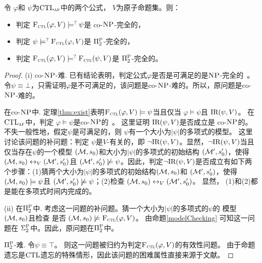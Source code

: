 \begin{theorem}[Entailment]
	\label{thm:comF}
	令 $\varphi$和 $\psi$为$\textrm{CTL}_{\textsc{a} \textsc{f}}$中的两个公式， $V$为原子命题集。则：
	\begin{itemize}
		\item[(i)] 判定  ${\textsc{F}_{\textsc{ctl}}}(\varphi, V ) \models^? \psi$是 co-$\textsc{NP}$-完全的，
		\item[(ii)] 判定  $\psi \models^? {\textsc{F}_{\textsc{ctl}}}(\varphi, V)$是 $\Pi_2^{\textsc{P}}$-完全的，
		\item[(iii)] 判定 ${\textsc{F}_{\textsc{ctl}}}(\varphi, V) \models^? {\textsc{F}_{\textsc{ctl}}}(\psi, V)$是 $\Pi_2^{\textsc{P}}$-完全的。
	\end{itemize}
\end{theorem}
\begin{proof}
	(i) co-$\textsc{NP}$-难. 已有结论表明，判定公式$\varphi$是否是可满足的是$\textsc{NP}$-完全的~\cite{meier2009complexity}。令$\psi \equiv \bot$，只需证明$\varphi$是不可满足的，该问题是co-$\textsc{NP}$-难的。所以，原问题是co-$\textsc{NP}$-难的。
	
	在co-$\textsc{NP}$中. 定理\ref{thm:exist}表明${\textsc{F}_{\textsc{ctl}}}(\varphi, V) \models \psi$当且仅当 $\varphi \models \psi$且 $\textrm{IR}(\psi, V)$。
	在$\textrm{CTL}_{\textsc{a} \textsc{f}}$中，判定 $\varphi \models \psi$是co-$\textsc{NP}$的~\cite{meier2009complexity}。
	这里证明 $\textrm{IR}(\psi, V)$是否成立是 co-$\textsc{NP}$的。不失一般性地，假定$\psi$是可满足的，则 $\psi$有一个大小为$|\psi|$的多项式的模型。
	这里讨论该问题的补问题：判定 $\psi$是$V$-有关的，即 $\neg \textrm{IR}(\psi, V)$。显然，$\neg \textrm{IR}(\psi, V)$当且仅当存在$\psi$的一个模型 $({\cal M},s_0)$和大小为$|\psi|$的多项式的初始结构 $({\cal M}',s_0')$，使得 $({\cal M},s_0) \leftrightarrow_V ({\cal M}',s_0')$且 $({\cal M}',s_0') \not \models \psi$。因此，判定$\neg \textrm{IR}(\psi, V)$是否成立有如下两个步骤：(1)猜两个大小为$|\psi|$的多项式的初始结构$({\cal M},s_0)$和 $({\cal M}',s_0')$，使得 $({\cal M},s_0) \models \psi$且 $({\cal M}',s_0') \not \models \psi$；(2)检查 $({\cal M},s_0) \leftrightarrow_V ({\cal M}',s_0')$。
	显然， (1)和(2)都是能在多项式时间内完成的。
	
	(ii) 在$\Pi_2^{\textsc{P}}$中. 考虑这一问题的补问题。猜一个大小为$|\psi|$的多项式的$\psi$的 模型 $({\cal M},s_0)$且检查 是否 $({\cal M}, s_0) \not \models {\textsc{F}_{\textsc{ctl}}}(\varphi, V)$。
	由命题\ref{modelChecking} 可知这一问题在 $\Sigma_2^{\textsc{P}}$中。因此，原问题在$\Pi_2^{\textsc{P}}$中。
	
	$\Pi_2^{\textsc{P}}$-难. 令$\psi \equiv \top$。 则这一问题被归约为判定${\textsc{F}_{\textsc{ctl}}}(\varphi, V)$的有效性问题。 
	由于命题遗忘是$\textrm{CTL}$遗忘的特殊情形，因此该问题的困难属性直接来源于文献\cite{DBLP:journals/jair/LangLM03}。
	

\end{proof}
